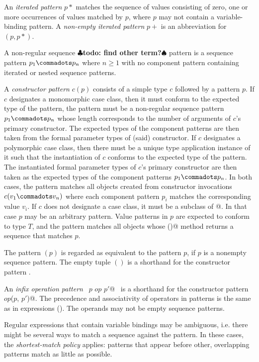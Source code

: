 \documentclass[a4paper,12pt,twoside,titlepage]{book}
\renewcommand{\todo}[1]{{$\clubsuit$\bf todo: #1$\spadesuit$}}
\begin{document}
An {\em iterated pattern} $p*$ matches the sequence of values
consisting of zero, one or more occurrences of values matched by $p$,
where $p$ may not contain a variable-binding pattern. A {\em non-empty
iterated pattern} $p+$ is an abbreviation for $(p,p*)$. 

A non-regular sequence \todo{find other term?}
pattern is a sequence pattern $p_1 \commadots p_n$ 
where $n \geq 1$ with no component pattern containing iterated or nested
sequence patterns.

A {\em constructor pattern} $c ( p )$ consists of a simple type $c$
followed by a pattern $p$.  If $c$ designates a monomorphic case
class, then it must conform to the expected type of the pattern, the
pattern must be a non-regular sequence pattern $p_1 \commadots p_n$
whose length corresponds to the number of arguments of $c$'s primary
constructor. The expected types of the component patterns are then
taken from the formal parameter types of (said) constructor.  If $c$
designates a polymorphic case class, then there must be a unique type
application instance of it such that the instantiation of $c$ conforms
to the expected type of the pattern. The instantiated formal parameter
types of $c$'s primary constructor are then taken as the expected
types of the component patterns $p_1\commadots p_n$.  In both cases,
the pattern matches all objects created from constructor invocations
$c(v_1 \commadots v_n)$ where each component pattern $p_i$ matches the
corresponding value $v_i$. If $c$ does not designate a case class, it
must be a subclass of \lstinline@Seq[$T\,$]@. In that case $p$ may be an
arbitrary pattern. Value patterns in $p$ are expected to conform to
type $T$, and the pattern matches all objects whose \lstinline@elements()@
method returns a sequence that matches $p$.

The pattern $(p)$ is regarded as equivalent to the pattern $p$, if $p$
is a nonempty sequence pattern. The empty tuple $()$ is a shorthand
for the constructor pattern .

An {\em infix operation pattern} ~\lstinline@$p$ $op$ $p'$@~ is a shorthand for the
constructor pattern ~\lstinline@$op$($p$, $p'$)@.  The precedence and
associativity of operators in patterns is the same as in expressions
(). The operands may not be empty sequence
patterns.

Regular expressions that contain variable bindings may be ambiguous,
i.e. there might be several ways to match a sequence against the
pattern. In these cases, the \emph{shortest-match policy} applies:
patterns that appear before other, overlapping patterns match
as little as possible.
\end{document}
